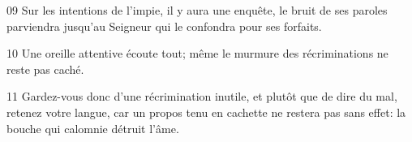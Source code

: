 
09 Sur les intentions de l’impie, il y aura une enquête, le bruit de ses paroles parviendra jusqu’au Seigneur qui le confondra pour ses forfaits.

10 Une oreille attentive écoute tout; même le murmure des récriminations ne reste pas caché.

11 Gardez-vous donc d’une récrimination inutile, et plutôt que de dire du mal, retenez votre langue, car un propos tenu en cachette ne restera pas sans effet: la bouche qui calomnie détruit l’âme.
